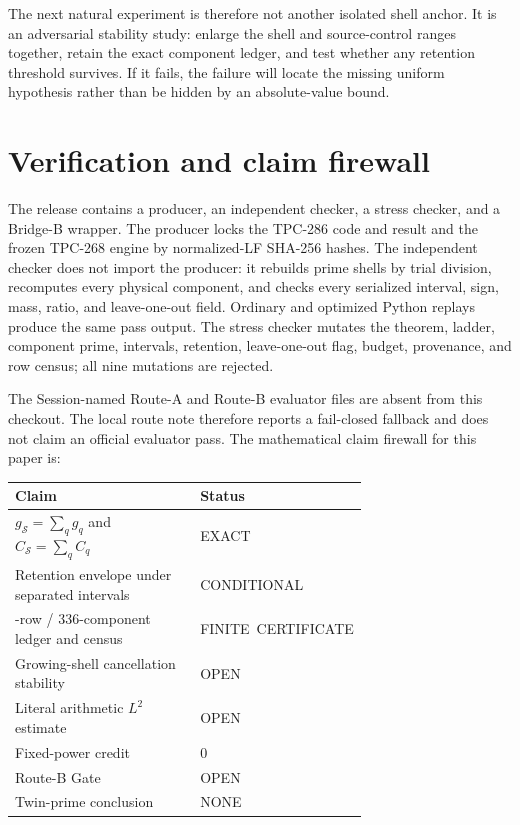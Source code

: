 \documentclass[11pt]{article}
\newcommand{\1}{\mathbf{1}}
\newcommand{\shell}{\mathcal S}
\begin{document}
The next natural experiment is therefore not another isolated shell anchor.
It is an adversarial stability study: enlarge the shell and source-control
ranges together, retain the exact component ledger, and test whether any
retention threshold survives.  If it fails, the failure will locate the
missing uniform hypothesis rather than be hidden by an absolute-value bound.

\section{Verification and claim firewall}

The release contains a producer, an independent checker, a stress checker, and
a Bridge-B wrapper.  The producer locks the TPC-286 code and result and the
frozen TPC-268 engine by normalized-LF SHA-256 hashes.  The independent checker
does not import the producer: it rebuilds prime shells by trial division,
recomputes every physical component, and checks every serialized interval,
sign, mass, ratio, and leave-one-out field.  Ordinary and optimized Python
replays produce the same pass output.  The stress checker mutates the theorem,
ladder, component prime, intervals, retention, leave-one-out flag, budget,
provenance, and row census; all nine mutations are rejected.

The Session-named Route-A and Route-B evaluator files are absent from this
checkout.  The local route note therefore reports a fail-closed fallback and
does not claim an official evaluator pass.  The mathematical claim firewall
for this paper is:

\begin{center}
\begin{tabular}{>{\raggedright\arraybackslash}p{0.70\linewidth}l}
\toprule
Claim & Status\\
\midrule
$g_{\shell}=\sum_qg_q$ and $C_{\shell}=\sum_qC_q$ & EXACT\\
Retention envelope under separated intervals & CONDITIONAL\\
84-row / 336-component ledger and census & FINITE\ CERTIFICATE\\
Growing-shell cancellation stability & OPEN\\
Literal arithmetic $L^2$ estimate & OPEN\\
Fixed-power credit & 0\\
Route-B Gate & OPEN\\
Twin-prime conclusion & NONE\\
\bottomrule
\end{tabular}
\end{center}
\end{document}
